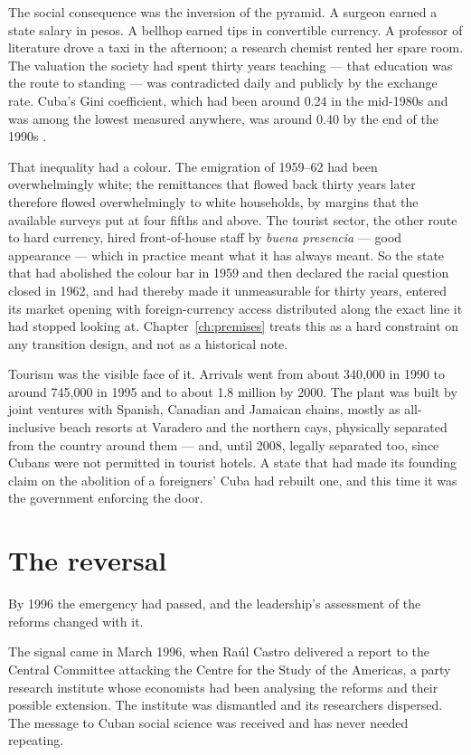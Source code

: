 The social consequence was the inversion of the pyramid. A surgeon earned a
state salary in pesos. A bellhop earned tips in convertible currency. A
professor of literature drove a taxi in the afternoon; a research chemist rented
her spare room. The valuation the society had spent thirty years teaching ---
that education was the route to standing --- was contradicted daily and
publicly by the exchange rate. Cuba's Gini coefficient, which had been around
0.24 in the mid-1980s and was among the lowest measured anywhere, was around
0.40 by the end of the 1990s \citep{mesalago2005}.\unv{}

That inequality had a colour. The emigration of 1959--62 had been
overwhelmingly white; the remittances that flowed back thirty years later
therefore flowed overwhelmingly to white households, by margins that the
available surveys put at four fifths and above.\unv{} The tourist sector, the
other route to hard currency, hired front-of-house staff by \emph{buena
presencia} --- good appearance --- which in practice meant what it has always
meant. So the state that had abolished the colour bar in 1959 and then declared
the racial question closed in 1962, and had thereby made it unmeasurable for
thirty years, entered its market opening with foreign-currency access
distributed along the exact line it had stopped looking at.
Chapter~\ref{ch:premises} treats this as a hard constraint on any transition
design, and not as a historical note.

Tourism was the visible face of it. Arrivals went from about 340,000 in 1990 to
around 745,000 in 1995 and to about 1.8 million by 2000.\unv{} The plant was
built by joint ventures with Spanish, Canadian and Jamaican chains, mostly as
all-inclusive beach resorts at Varadero and the northern cays, physically
separated from the country around them --- and, until 2008, legally separated
too, since Cubans were not permitted in tourist hotels. A state that had made
its founding claim on the abolition of a foreigners' Cuba had rebuilt one, and
this time it was the government enforcing the door.

\section{The reversal}

By 1996 the emergency had passed, and the leadership's assessment of the
reforms changed with it.

The signal came in March 1996, when Ra\'ul Castro delivered a report to the
Central Committee attacking the Centre for the Study of the Americas, a party
research institute whose economists had been analysing the reforms and their
possible extension. The institute was dismantled and its researchers dispersed.
The message to Cuban social science was received and has never needed
repeating.

